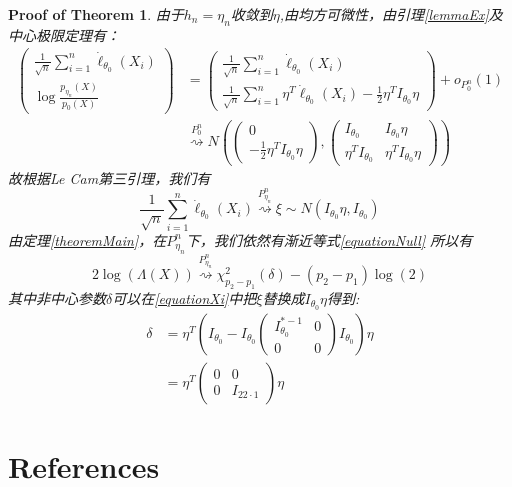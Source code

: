 \documentclass[review]{elsarticle}
\newtheorem{proofOfTheorem}{Proof of Theorem}
\begin{document}
\begin{proofOfTheorem}
    由于$h_n=\eta_n$收敛到$\eta$,由均方可微性，由引理\ref{lemmaEx}及中心极限定理有：
\begin{equation}
    \begin{aligned}
    \left(
    \begin{matrix}
        \frac{1}{\sqrt{n}}\sum^n_{i=1}\dot{\ell}_{\theta_0}(X_i)
        \\
        \log \frac{p_{\eta_n}(X)}{p_0(X)}
    \end{matrix}
    \right)
    &=\left(
        \begin{matrix}
        \frac{1}{\sqrt{n}}\sum^n_{i=1}\dot{\ell}_{\theta_0}(X_i)
        \\
        \frac{1}{\sqrt{n}}\sum^n_{i=1}\eta^T\dot{\ell}_{\theta_0}(X_i)-\frac{1}{2}\eta^TI_{\theta_0}\eta
        \end{matrix}
    \right)
    +o_{P_0^n}(1)\\
    &\overset{P_0^n}{\rightsquigarrow}
    N(
    \left(
    \begin{matrix}
        0\\
        -\frac{1}{2}\eta^TI_{\theta_0}\eta
    \end{matrix}
    \right),
    \left(
        \begin{matrix}
            I_{\theta_0}&I_{\theta_0}\eta\\
            \eta^TI_{\theta_0}&\eta^TI_{\theta_0}\eta
        \end{matrix}
    \right)
    )
    \end{aligned}
\end{equation}
故根据Le Cam第三引理，我们有
\begin{equation}
    \frac{1}{\sqrt{n}}\sum^n_{i=1}\dot{\ell}_{\theta_0}(X_i)\overset{P^n_{\eta_n}}{\rightsquigarrow}\xi\sim N(I_{\theta_0}\eta,I_{\theta_0})
\end{equation}
由定理\ref{theoremMain}，在$P_{\eta_n}^n$下，我们依然有渐近等式\eqref{equationNull}
所以有
\begin{equation}
    2\log(\Lambda(X))\overset{P_{\eta_n}^n}{\rightsquigarrow} \chi^2_{p_2-p_1}(\delta)-(p_2-p_1)\log(2)
\end{equation}
其中非中心参数$\delta$可以在\eqref{equationXi}中把$\xi$替换成$I_{\theta_0}\eta$得到:
\begin{equation}
    \begin{aligned}
        \delta&=\eta^T(
        I_{\theta_0}-
        I_{\theta_0}
        \left(\begin{matrix} 
                I^{*-1}_{\theta_0}&0\\
                0&0
        \end{matrix}\right)
        I_{\theta_0}
    )\eta
    \\
    &=\eta^T
    \left(
        \begin{matrix}
            0&0\\
            0&I_{22\cdot 1}
        \end{matrix}
    \right)
    \eta
    \end{aligned}
\end{equation}
\end{proofOfTheorem}



\section*{References}


\end{document}
